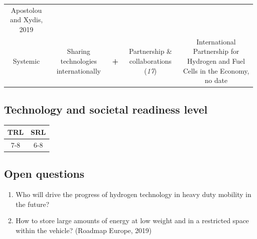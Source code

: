 \documentclass[
]{book}
\providecommand{\tightlist}{%
  \setlength{\itemsep}{0pt}\setlength{\parskip}{0pt}}
\begin{document}
\begin{longtable}[]{@{}ccccc@{}}
\begin{minipage}[t]{0.17\columnwidth}
Apostolou and Xydis, 2019\strut
\end{minipage}\tabularnewline
\begin{minipage}[t]{0.17\columnwidth}\centering
Systemic\strut
\end{minipage} & \begin{minipage}[t]{0.16\columnwidth}\centering
Sharing technologies internationally\strut
\end{minipage} & \begin{minipage}[t]{0.17\columnwidth}\centering
\textbf{+}\strut
\end{minipage} & \begin{minipage}[t]{0.17\columnwidth}\centering
Partnership \& collaborations (\emph{17})\strut
\end{minipage} & \begin{minipage}[t]{0.17\columnwidth}\centering
International Partnership for Hydrogen and Fuel Cells in the Economy, no date\strut
\end{minipage}\tabularnewline
\bottomrule
\end{longtable}

\hypertarget{technology-and-societal-readiness-level-9}{%
\subsection*{Technology and societal readiness level}\label{technology-and-societal-readiness-level-9}}

\begin{longtable}[]{@{}cc@{}}
\toprule
TRL & SRL\tabularnewline
\midrule
\endhead
7-8 & 6-8\tabularnewline
\bottomrule
\end{longtable}

\hypertarget{open-questions-9}{%
\subsection*{Open questions}\label{open-questions-9}}

\begin{enumerate}
\def\labelenumi{\arabic{enumi}.}
\tightlist
\item
  Who will drive the progress of hydrogen technology in heavy duty mobility in the future?
\item
  How to store large amounts of energy at low weight and in a restricted space within the vehicle? (Roadmap Europe, 2019)
\end{enumerate}
\end{document}
